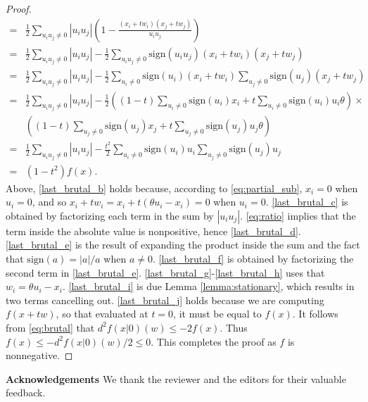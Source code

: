 \documentclass[12pt]{article}
\theoremstyle{definition}
\theoremstyle{plain}
\begin{document}
\begin{proof}
\begin{subequations}
\begin{align}
	\label{last_brutal_d} = & \frac{1}{2} \sum\limits_{u_iu_j \neq 0} |u_i u_j|\left(1 - \frac{(x_i+t w_i) (x_j+t w_j)}{u_iu_j}\right)\\
	\label{last_brutal_e} = & \frac{1}{2} \sum\limits_{u_iu_j \neq 0} |u_i u_j| - \frac{1}{2} \sum\limits_{u_iu_j \neq 0} \mathrm{sign}(u_iu_j)(x_i+t w_i) (x_j+t w_j)\\
	\label{last_brutal_f} = & \frac{1}{2} \sum\limits_{u_iu_j \neq 0} |u_i u_j| - \frac{1}{2} \sum\limits_{u_i \neq 0} \mathrm{sign}(u_i)(x_i+t w_i)\sum\limits_{u_j \neq 0}  \mathrm{sign}(u_j)(x_j+t w_j) \\
	\label{last_brutal_g} = & \frac{1}{2} \sum\limits_{u_iu_j \neq 0} |u_i u_j| - \frac{1}{2} \left((1-t)\sum\limits_{u_i \neq 0} \mathrm{sign}(u_i)x_i+t\sum\limits_{u_i \neq 0}\mathrm{sign}(u_i)u_i \theta \right) \times \\ \label{last_brutal_h} & 
	\left((1-t)\sum\limits_{u_j \neq 0}  \mathrm{sign}(u_j)x_j+t\sum\limits_{u_j \neq 0}\mathrm{sign}(u_j)u_j\theta \right) \\
	\label{last_brutal_i} = & \frac{1}{2} \sum\limits_{u_iu_j \neq 0} |u_i u_j| -\frac{ t^2}{2} \sum\limits_{u_i \neq 0} \mathrm{sign}(u_i)u_i  \sum\limits_{u_j \neq 0} \mathrm{sign}(u_j)u_j \\
	\label{last_brutal_j} = & (1-t^2)f(x).
	\end{align}
\end{subequations}
Above, \eqref{last_brutal_b} holds because, according to \eqref{eq:partial_sub}, $x_i=0$ when $u_i=0$, and so $x_i+t w_i = x_i + t (\theta u_i - x_i) = 0$ when $u_i=0$. \eqref{last_brutal_c} is obtained by factorizing each term in the sum by $|u_i u_j|$. \eqref{eq:ratio} implies that the term inside the absolute value is nonpositive, hence \eqref{last_brutal_d}. \eqref{last_brutal_e} is the result of expanding the product inside the sum and the fact that $\mathrm{sign}(a) = |a|/a$ when $a \neq 0$. \eqref{last_brutal_f} is obtained by factorizing the second term in \eqref{last_brutal_e}. \eqref{last_brutal_g}-\eqref{last_brutal_h} uses that $w_i = \theta u_i - x_i$. \eqref{last_brutal_i} is due Lemma \ref{lemma:stationary}, which results in two terms cancelling out. \eqref{last_brutal_j} holds because we are computing $f(x+tw)$, so that evaluated at $t=0$, it must be equal to $f(x)$. It follows from {\protect\eqref{eq:brutal}} that $d^2f(x|0)(w) \leqslant - 2f(x)$. Thus $f(x) \leqslant  -d^2f(x|0)(w)/2 \leqslant 0$. This completes the proof as $f$ is nonnegative.
\end{proof}

\noindent\textbf{Acknowledgements} We thank the reviewer and the editors for their valuable feedback.


    

\end{document}
